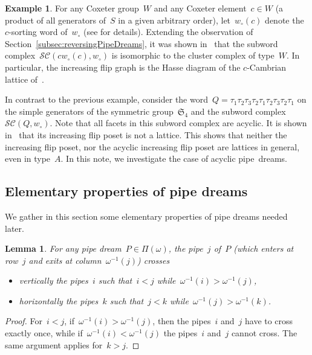 \documentclass{amsart}
\newtheorem{lemma}[theorem]{Lemma}
\theoremstyle{definition}
\newtheorem{example}[theorem]{Example}
\newcommand{\fS}{\mathfrak{S}} %
\newcommand{\pipeDreams}{\Pi} %
\newcommand{\wo}{w_\circ} %
\newcommand{\subwordComplex}{\mathcal{SC}} %
\begin{document}
\begin{example}
For any Coxeter group~$W$ and any Coxeter element~$c \in W$ (a product of all generators of~$S$ in a given arbitrary order), let~$\wo(c)$ denote the $c$-sorting word of~$\wo$ (see \cite{Reading-CambrianLattices} for details). Extending the observation of Section~\ref{subsec:reversingPipeDreams}, it was shown in~\cite{CeballosLabbeStump} that the subword complex~$\subwordComplex(c\wo(c), \wo)$ is isomorphic to the cluster complex of type~$W$. In particular, the increasing flip graph is the Hasse diagram of the $c$-Cambrian lattice of~\cite{Reading-CambrianLattices}.
\end{example}

In contrast to the previous example, consider the word~$Q = \tau_1 \tau_2 \tau_3 \tau_2 \tau_1 \tau_2 \tau_3 \tau_2 \tau_1$ on the simple generators of the symmetric group~$\fS_4$ and the subword complex~$\subwordComplex(Q,\wo)$. Note that all facets in this subword complex are acyclic. It is shown in~\cite[Rem.~5.12]{PilaudStump-brickPolytope} that its increasing flip poset is not a lattice. This shows that neither the increasing flip poset, nor the acyclic increasing flip poset are lattices in general, even in type~$A$. In this note, we investigate the case of acyclic pipe~dreams.


\subsection{Elementary properties of pipe dreams}
\label{subsec:elementaryProperties}

We gather in this section some elementary properties of pipe dreams needed later.

\begin{lemma}
\label{lem:horiVertCrossings}
For any pipe dream~$P \in \pipeDreams(\omega)$, the pipe~$j$ of~$P$ (which enters at row~$j$ and exits at column~$\omega^{-1}(j)$) crosses
\begin{itemize}
\item vertically the pipes~$i$ such that~$i < j$ while~$\omega^{-1}(i) > \omega^{-1}(j)$,
\item horizontally the pipes~$k$ such that~$j < k$ while~$\omega^{-1}(j) > \omega^{-1}(k)$.
\end{itemize}
\end{lemma}

\begin{proof}
For~$i < j$, if~$\omega^{-1}(i) > \omega^{-1}(j)$, then the pipes~$i$ and~$j$ have to cross exactly once, while if~$\omega^{-1}(i) < \omega^{-1}(j)$ the pipes~$i$ and~$j$ cannot cross. The same argument applies for~${k > j}$.
\end{proof}
\end{document}
